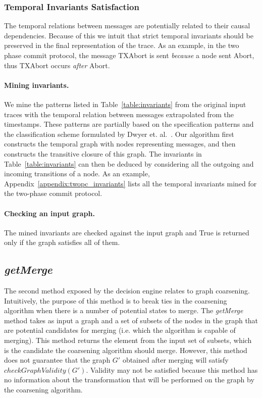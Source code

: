 \subsubsection{Temporal Invariants Satisfaction}

The temporal relations between messages are potentially related to
their causal dependencies. Because of this we intuit that strict
temporal invariants should be preserved in the final representation of
the trace. As an example, in the two phase commit protocol, the
message TXAbort is sent \textit{because} a node sent Abort, thus
TXAbort occurs \textit{after} Abort.

\paragraph{Mining invariants.} 

We mine the patterns listed in Table~\ref{table:invariants} from the
original input traces with the temporal relation between messages
extrapolated from the timestamps. These patterns are partially based
on the specification patterns and the classification scheme formulated
by Dwyer et. al.~\cite{SpecPatterns}. Our algorithm first constructs
the temporal graph with nodes representing messages, and then
constructs the transitive closure of this graph. The invariants in
Table~\ref{table:invariants} can then be deduced by considering all
the outgoing and incoming transitions of a node. As an example,
Appendix~\ref{appendix:twopc_invariants} lists all the temporal
invariants mined for the two-phase commit protocol.

\paragraph{Checking an input graph.} The mined invariants are checked
against the input graph and True is returned only if the graph
satisfies all of them.




\subsection{\textit{getMerge}}

The second method exposed by the decision engine relates to graph
coarsening. Intuitively, the purpose of this method is to break ties in the 
coarsening algorithm when there is a number of potential states to merge. 
The \emph{getMerge} method takes as input a graph and a
set of subsets of the nodes in the graph that are potential candidates
for merging (i.e. which the algorithm is capable of merging). This
method returns the element from the input set of subsets, which is the
candidate the coarsening algorithm should merge. However, this method
does not guarantee that the graph $G'$ obtained after merging will
satisfy $checkGraphValidity(G')$. Validity may not be satisfied because
this method has no information about the transformation that will be performed
on the graph by the coarsening algorithm.

